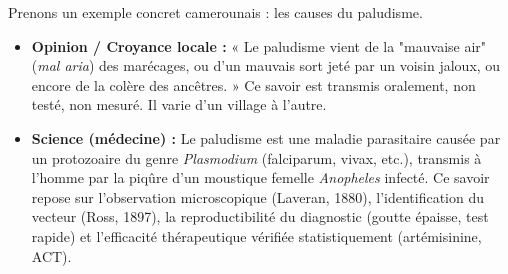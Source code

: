 \documentclass[11pt]{article}
\begin{document}
Prenons un exemple concret camerounais : les causes du paludisme.
\begin{itemize}
    \item \textbf{Opinion / Croyance locale :} « Le paludisme vient de la "mauvaise air" (\emph{mal aria}) des marécages, ou d'un mauvais sort jeté par un voisin jaloux, ou encore de la colère des ancêtres. » Ce savoir est transmis oralement, non testé, non mesuré. Il varie d'un village à l'autre.
    \item \textbf{Science (médecine) :} Le paludisme est une maladie parasitaire causée par un protozoaire du genre \emph{Plasmodium} (falciparum, vivax, etc.), transmis à l'homme par la piqûre d'un moustique femelle \emph{Anopheles} infecté. Ce savoir repose sur l'observation microscopique (Laveran, 1880), l'identification du vecteur (Ross, 1897), la reproductibilité du diagnostic (goutte épaisse, test rapide) et l'efficacité thérapeutique vérifiée statistiquement (artémisinine, ACT).
\end{itemize}
\end{document}
